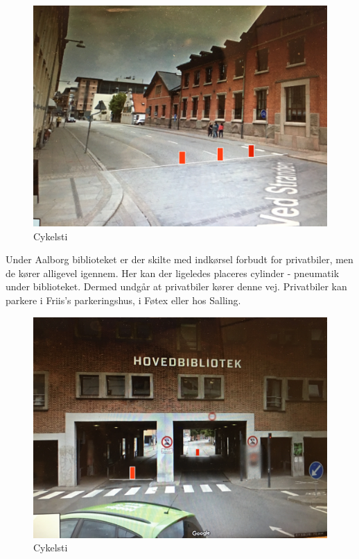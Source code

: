 \begin{figure}[htbp]
  \centering
  \begin{adjustbox}{max width=\textwidth}
    \includegraphics{figures/Billederogfigur/3.jpg}
 \end{adjustbox}
  \caption{Cykelsti}
   \label{fig:cykelsti}
\end{figure}
Under Aalborg biblioteket er der skilte med indkørsel forbudt for privatbiler, men de kører alligevel igennem. Her kan der ligeledes placeres cylinder - pneumatik under biblioteket. Dermed undgår at privatbiler kører denne vej. Privatbiler kan parkere i Friis’s parkeringshus, i Føtex eller hos Salling.
\begin{figure}[htbp]
  \centering
  \begin{adjustbox}{max width=\textwidth}
    \includegraphics{figures/Billederogfigur/4.jpg}
 \end{adjustbox}
  \caption{Cykelsti}
   \label{fig:cykelsti}
\end{figure}

